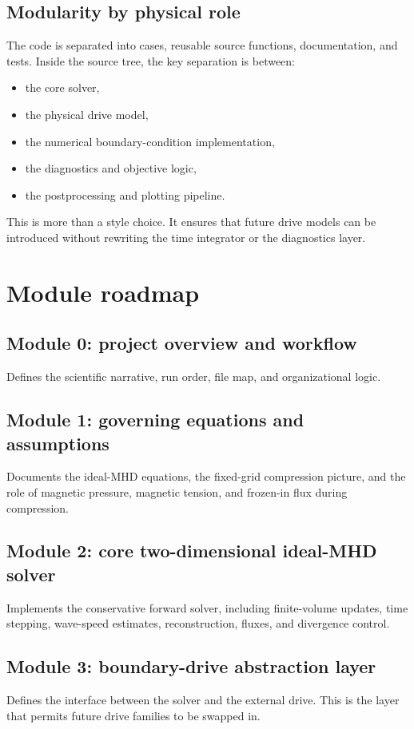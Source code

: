 \documentclass[11pt]{article}
\begin{document}
\subsection{Modularity by physical role}
The code is separated into cases, reusable source functions, documentation, and tests. Inside the source tree, the key separation is between:
\begin{itemize}[leftmargin=1.8em]
    \item the core solver,
    \item the physical drive model,
    \item the numerical boundary-condition implementation,
    \item the diagnostics and objective logic,
    \item the postprocessing and plotting pipeline.
\end{itemize}
This is more than a style choice. It ensures that future drive models can be introduced without rewriting the time integrator or the diagnostics layer.

\section{Module roadmap}
\subsection{Module 0: project overview and workflow}
Defines the scientific narrative, run order, file map, and organizational logic.

\subsection{Module 1: governing equations and assumptions}
Documents the ideal-MHD equations, the fixed-grid compression picture, and the role of magnetic pressure, magnetic tension, and frozen-in flux during compression.

\subsection{Module 2: core two-dimensional ideal-MHD solver}
Implements the conservative forward solver, including finite-volume updates, time stepping, wave-speed estimates, reconstruction, fluxes, and divergence control.

\subsection{Module 3: boundary-drive abstraction layer}
Defines the interface between the solver and the external drive. This is the layer that permits future drive families to be swapped in.
\end{document}
